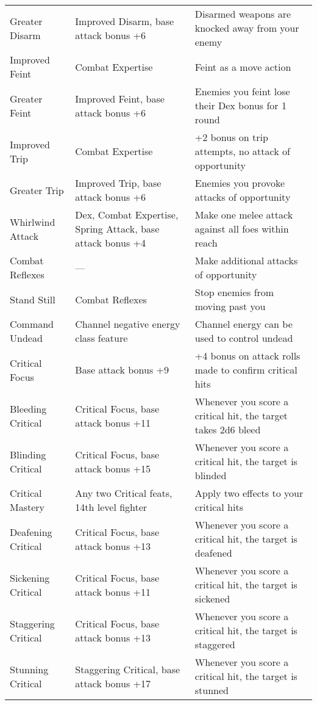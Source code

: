 \begin{table*}[]
\begin{tabularx}{\linewidth}{lXl}
\enspace \enspace Greater Disarm & Improved Disarm, base attack bonus +6 & Disarmed weapons are knocked away from your enemy\\
\enspace Improved Feint & Combat Expertise & Feint as a move action\\
\enspace \enspace Greater Feint & Improved Feint, base attack bonus +6 & Enemies you feint lose their Dex bonus for 1 round \\
\enspace Improved Trip & Combat Expertise & +2 bonus on trip attempts, no attack of opportunity\\
\enspace \enspace Greater Trip & Improved Trip, base attack bonus +6 & Enemies you provoke attacks of opportunity\\
\enspace Whirlwind Attack & Dex, Combat Expertise, Spring Attack, base attack bonus +4 & Make one melee attack against all foes within reach\\
Combat Reflexes & --- & Make additional attacks of opportunity\\
\enspace Stand Still & Combat Reflexes & Stop enemies from moving past you\\
Command Undead & Channel negative energy class feature & Channel energy can be used to control undead\\
Critical Focus & Base attack bonus +9 & +4 bonus on attack rolls made to confirm critical hits\\
\enspace Bleeding Critical & Critical Focus, base attack bonus +11 & Whenever you score a critical hit, the target takes 2d6 bleed \\
\enspace Blinding Critical & Critical Focus, base attack bonus +15 & Whenever you score a critical hit, the target is blinded\\
\enspace Critical Mastery & Any two Critical feats, 14th level fighter  & Apply two effects to your critical hits\\
\enspace Deafening Critical & Critical Focus, base attack bonus +13 & Whenever you score a critical hit, the target is deafened\\
\enspace Sickening Critical & Critical Focus, base attack bonus +11 & Whenever you score a critical hit, the target is sickened\\
\enspace Staggering Critical & Critical Focus, base attack bonus +13 & Whenever you score a critical hit, the target is staggered\\
\enspace Stunning Critical & Staggering Critical, base attack bonus +17 & Whenever you score a critical hit, the target is stunned\\

\end{tabularx}
\end{table*}
